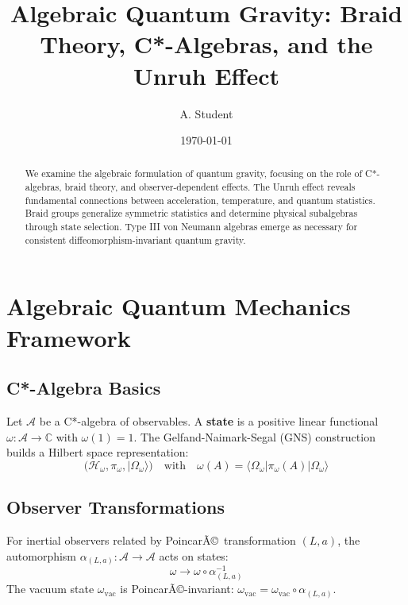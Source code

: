 \documentclass[aps,prl,reprint]{revtex4-2}
\begin{document}
\title{Algebraic Quantum Gravity: Braid Theory, C*-Algebras, and the Unruh
Effect}
\author{A. Student}
\date{\today}

\begin{abstract}
We examine the algebraic formulation of quantum gravity, focusing on the
role of C*-algebras, braid theory, and observer-dependent effects. The Unruh
effect reveals fundamental connections between acceleration, temperature,
and quantum statistics. Braid groups generalize symmetric statistics and
determine physical subalgebras through state selection. Type III von Neumann
algebras emerge as necessary for consistent diffeomorphism-invariant quantum
gravity.
\end{abstract}

\maketitle


\section{Algebraic Quantum Mechanics Framework}

\subsection{C*-Algebra Basics}

Let $\mathcal{A}$ be a C*-algebra of observables. A \textbf{state} is a
positive linear functional $\omega: \mathcal{A} \to \mathbb{C}$ with $%
\omega(1) = 1$. The Gelfand-Naimark-Segal (GNS) construction builds a
Hilbert space representation: 
\begin{equation*}
(\mathcal{H}_\omega, \pi_\omega, |\Omega_\omega\rangle) \quad \text{with}
\quad \omega(A) = \langle \Omega_\omega | \pi_\omega(A) | \Omega_\omega
\rangle 
\end{equation*}

\subsection{Observer Transformations}

For inertial observers related by Poincar\~{A}\copyright\ transformation $%
(L,a)$, the automorphism $\alpha_{(L,a)}: \mathcal{A} \to \mathcal{A}$ acts
on states: 
\begin{equation*}
\omega \to \omega \circ \alpha_{(L,a)}^{-1} 
\end{equation*}
The vacuum state $\omega_{\text{vac}}$ is Poincar\~{A}\copyright -invariant: 
$\omega_{\text{vac}} = \omega_{\text{vac}} \circ \alpha_{(L,a)}$.
\end{document}
